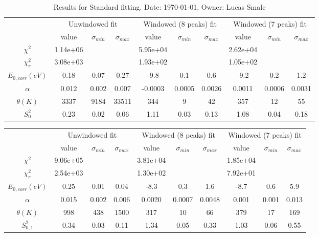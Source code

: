 \documentclass{article}
\begin{document}
\begin{landscape}
\begin{table}[ht]
\centering
\begin{tabular}{c||c|c|c||c|c|c||c|c|c}
\hline
&\multicolumn{3}{|c}{Unwindowed fit}&\multicolumn{3}{|c}{Windowed (8 peaks) fit}&\multicolumn{3}{|c}{Windowed (7 peaks) fit}\\
& value & $\sigma_{min}$ & $\sigma_{max}$& value & $\sigma_{min}$ & $\sigma_{max}$& value & $\sigma_{min}$ & $\sigma_{max}$\\
\hline
$\chi^2$   & 1.14e+06 & & & 5.95e+04 & & & 2.62e+04 & & \\
$\chi^2_r$ & 3.08e+03 & & & 1.93e+02 & & & 1.05e+02 & & \\
\hline
$E_{0,corr} (eV)$& 0.18 & 0.07 & 0.27 & -9.8 & 0.1 & 0.6 & -9.2 & 0.2 & 1.2 \\
$\alpha $       & 0.012 & 0.002 & 0.007 & -0.0003 & 0.0005 & 0.0026 & 0.0011 & 0.0006 & 0.0031 \\
$\theta (K) $   & 3337 & 9184 & 33511 & 344 & 9 & 42 & 357 & 12 & 55 \\
$S^2_{0}$& 0.23 & 0.02 & 0.06 & 1.11 & 0.03 & 0.13 & 1.08 & 0.04 & 0.18 \\
\hline
    \end{tabular}
    \caption{Results for Standard fitting. Date: \today. Owner: Lucas Smale}
\end{table}
\begin{table}[ht]
\centering
\begin{tabular}{c||c|c|c||c|c|c||c|c|c}
\hline
&\multicolumn{3}{|c}{Unwindowed fit}&\multicolumn{3}{|c}{Windowed (8 peaks) fit}&\multicolumn{3}{|c}{Windowed (7 peaks) fit}\\
& value & $\sigma_{min}$ & $\sigma_{max}$& value & $\sigma_{min}$ & $\sigma_{max}$& value & $\sigma_{min}$ & $\sigma_{max}$\\
\hline
$\chi^2$   & 9.06e+05 & & & 3.81e+04 & & & 1.85e+04 & & \\
$\chi^2_r$ & 2.54e+03 & & & 1.30e+02 & & & 7.92e+01 & & \\
\hline
$E_{0,corr} (eV)$& 0.25 & 0.01 & 0.04 & -8.3 & 0.3 & 1.6 & -8.7 & 0.6 & 5.9 \\
$\alpha $       & 0.015 & 0.002 & 0.006 & 0.0020 & 0.0007 & 0.0048 & 0.001 & 0.001 & 0.013 \\
$\theta (K) $   & 998 & 438 & 1500 & 317 & 10 & 66 & 379 & 17 & 169 \\
$S^2_{0,1}$& 0.34 & 0.03 & 0.11 & 1.34 & 0.05 & 0.33 & 1.03 & 0.06 & 0.55 \\

\end{tabular}
\end{table}
\end{landscape}
\end{document}
